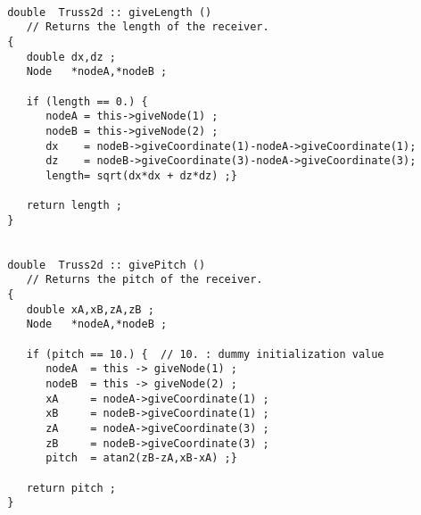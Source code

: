 \documentclass[12pt,draft]{article}
\begin{document}
 \begin{verbatim}

 double  Truss2d :: giveLength ()
    // Returns the length of the receiver.
 {
    double dx,dz ;
    Node   *nodeA,*nodeB ;

    if (length == 0.) {
       nodeA = this->giveNode(1) ;
       nodeB = this->giveNode(2) ;
       dx    = nodeB->giveCoordinate(1)-nodeA->giveCoordinate(1);
       dz    = nodeB->giveCoordinate(3)-nodeA->giveCoordinate(3);
       length= sqrt(dx*dx + dz*dz) ;}

    return length ;
 }


 double  Truss2d :: givePitch ()
    // Returns the pitch of the receiver.
 {
    double xA,xB,zA,zB ;
    Node   *nodeA,*nodeB ;

    if (pitch == 10.) {  // 10. : dummy initialization value
       nodeA  = this -> giveNode(1) ;
       nodeB  = this -> giveNode(2) ;
       xA     = nodeA->giveCoordinate(1) ;
       xB     = nodeB->giveCoordinate(1) ;
       zA     = nodeA->giveCoordinate(3) ;
       zB     = nodeB->giveCoordinate(3) ;
       pitch  = atan2(zB-zA,xB-xA) ;}

    return pitch ;
 }

 \end{verbatim}
\end{document}
